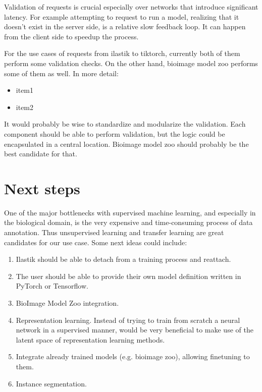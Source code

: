 \documentclass[12pt, a4paper]{article}
\begin{document}
Validation of requests is crucial especially over networks that introduce significant latency. For example attempting to request to run a model, realizing that it doesn't exist in the server side, is a relative slow feedback loop. It can happen from the client side to speedup the process.

For the use cases of requests from ilastik to tiktorch, currently both of them perform some validation checks. On the other hand, bioimage model zoo performs some of them as well. In more detail:

\begin{itemize}
    \itemsep -0.2em
    \item item1
    \item item2
\end{itemize}


It would probably be wise to standardize and modularize the validation. Each component should be able to perform validation, but the logic could be encapsulated in a central location. Bioimage model zoo should probably be the best candidate for that. 

\section{Next steps}
\label{sec:next_steps}

One of the major bottlenecks with supervised machine learning, and especially in the biological domain, is the very expensive and time-consuming process of data annotation. Thus unsupervised learning and transfer learning are great candidates for our use case. Some next ideas could include:

\begin{enumerate}
    \item Ilastik should be able to detach from a training process and reattach.
    \item The user should be able to provide their own model definition written in PyTorch or Tensorflow.
    \item BioImage Model Zoo integration.
    \item Representation learning. Instead of trying to train from scratch a neural network in a supervised manner, would be very beneficial to make use of the latent space of representation learning methods.
    \item Integrate already trained models (e.g. bioimage zoo), allowing finetuning to them.
    \item Instance segmentation.
\end{enumerate}

\clearpage



\end{document}
